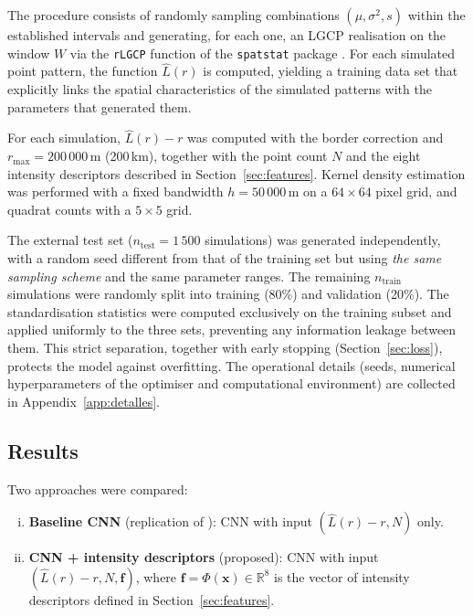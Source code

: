 \documentclass[a4paper,fleqn]{cas-sc}
\numberwithin{equation}{section}
\begin{document}
The procedure consists of randomly sampling combinations
$(\mu, \sigma^2, s)$ within the established intervals and generating,
for each one, an LGCP realisation on the window $W$ via the
\texttt{rLGCP} function of the \texttt{spatstat} package
\citep{spatstat}. For each simulated point pattern, the function
$\hat{L}(r)$ is computed, yielding a training data set that
explicitly links the spatial characteristics of the simulated
patterns with the parameters that generated them.

For each simulation, $\hat{L}(r)-r$ was computed with the border
correction and $r_{\max}=200\,000$\,m (200\,km), together with the
point count $N$ and the eight intensity descriptors described in
Section~\ref{sec:features}. Kernel density estimation was performed
with a fixed bandwidth $h=50\,000$\,m on a $64\times 64$ pixel grid,
and quadrat counts with a $5\times 5$ grid.

The external test set ($n_{\mathrm{test}}=1\,500$ simulations) was
generated independently, with a random seed different from that of
the training set but using \emph{the same sampling scheme} and the
same parameter ranges. The remaining $n_{\mathrm{train}}$ simulations
were randomly split into training (80\%) and validation (20\%). The
standardisation statistics were computed exclusively on the training
subset and applied uniformly to the three sets, preventing any
information leakage between them. This strict separation, together
with early stopping (Section~\ref{sec:loss}), protects the model
against overfitting. The operational details (seeds, numerical
hyperparameters of the optimiser and computational environment) are
collected in Appendix~\ref{app:detalles}.

\subsection{Results}
\label{sec:sim_results}

Two approaches were compared:
\begin{enumerate}[(i)]
    \item \textbf{Baseline CNN} (replication of \citealt{VIHRS2022}):
    CNN with input $(\hat{L}(r)-r, N)$ only.

    \item \textbf{CNN + intensity descriptors} (proposed): CNN with
    input $(\hat{L}(r)-r, N, \mathbf{f})$, where
    $\mathbf{f}=\Phi(\mathbf{x})\in\mathbb{R}^{8}$ is the vector of
    intensity descriptors defined in Section~\ref{sec:features}.
\end{enumerate}
\end{document}
